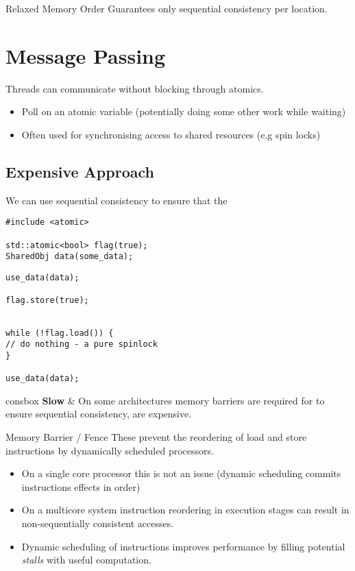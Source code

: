 \begin{definitionbox}{Relaxed Memory Order}
	Guarantees only sequential consistency per location.
\end{definitionbox}

\section{Message Passing}
Threads can communicate without blocking through atomics.
\begin{itemize}
	\item Poll on an atomic variable (potentially doing some other work while waiting)
	\item Often used for synchronising access to shared resources (e.g spin locks)
\end{itemize}

\subsection{Expensive Approach}
We can use sequential consistency to ensure that the
\begin{verbatim}  
#include <atomic>

std::atomic<bool> flag(true);
SharedObj data(some_data);
\end{verbatim}
\begin{minipage}{.49\textwidth}
	\begin{verbatim}
use_data(data);

flag.store(true);


  \end{verbatim}
\end{minipage}
\hfill
\begin{minipage}{.49\textwidth}
	\begin{verbatim}
while (!flag.load()) {
// do nothing - a pure spinlock
}

use_data(data);
  \end{verbatim}
\end{minipage}

\begin{tabbox}{consbox}
	\textbf{Slow} &  On some architectures memory barriers are required for to ensure sequential consistency, are expensive. \\
\end{tabbox}

\begin{definitionbox}{Memory Barrier / Fence}
	These prevent the reordering of load and store instructions by dynamically scheduled processors.
	\begin{itemize}
		\item On a single core processor this is not an issue (dynamic scheduling commits instructions effects in order)
		\item On a multicore system instruction reordering in execution stages can result in non-sequentially consistent accesses.
		\item Dynamic scheduling of instructions improves performance by filling potential \textit{stalls} with useful computation.
	\end{itemize}
\end{definitionbox}

